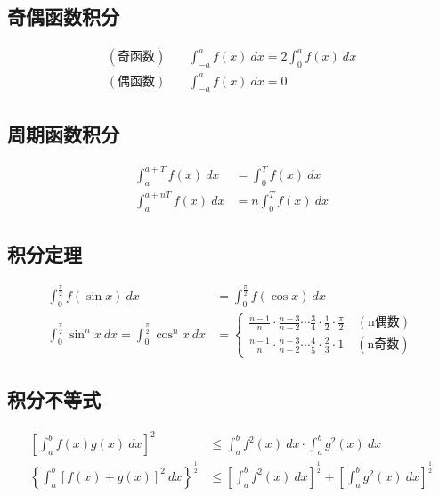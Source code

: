 \subsection{奇偶函数积分}
	\begin{align}
	(\mbox{奇函数})\quad	&\int_{-a}^{a}f(x)\ dx=2\int_{0}^{a}f(x)\ dx\label{Odd_even_function_integral_1}\\
	(\mbox{偶函数})\quad	&\int_{-a}^{a}f(x)\ dx=0\label{Odd_even_function_integral_2}
	\end{align}
\subsection{周期函数积分}
	\begin{align}
		\int_{a}^{a+T}f(x)\ dx&=\int_{0}^{T}f(x)\ dx\label{Periodic_function_integral_1}\\
		\int_{a}^{a+nT}f(x)\ dx&=n\int_{0}^{T}f(x)\ dx\label{Periodic_function_integral_2}
	\end{align}
\subsection{积分定理}
\begin{align}
	\int_{0}^{\frac{\pi}{2}}f(\sin x)\ dx&=\int_{0}^{\frac{\pi}{2}}f(\cos x)\ dx\label{Definite_integral_theorem_1}\\
	\int_{0}^{\frac{\pi}{2}}\sin^n x\ dx=\int_{0}^{\frac{\pi}{2}}\cos^n x\ dx&=\begin{cases}
				\frac{n-1}{n}\cdot\frac{n-3}{n-2}\cdots\frac{3}{4}\cdot\frac{1}{2}\cdot\frac{\pi}{2}\quad(\mbox{n偶数})\\
		\frac{n-1}{n}\cdot\frac{n-3}{n-2}\cdots\frac{4}{5}\cdot\frac{2}{3}\cdot 1\quad(\mbox{n奇数})
	\end{cases}\label{Definite_integral_theorem_2}
\end{align}
\subsection{积分不等式}
\begin{align}
	\left[\int_{a}^{b}f(x)g(x)\ dx\right]^2&\leqslant \int_{a}^{b}f^2(x)\ dx\cdot \int_{a}^{b}g^2(x)\ dx \label{Definite_integral_inequality_1}\\
	\left\{\int_{a}^{b}\left[f(x)+g(x)\right]^2 \ dx\right\}^{\frac{1}{2}}&\leqslant \left[\int_{a}^{b}f^2(x)\ dx\right]^{\frac{1}{2}}+\left[\int_{a}^{b}g^2(x)\ dx\right]^{\frac{1}{2}}\label{Definite_integral_inequality_2}
\end{align}
